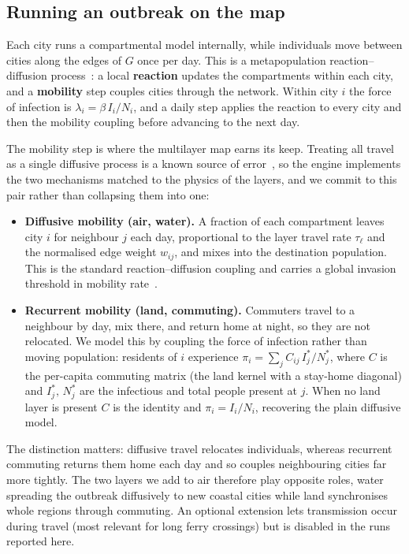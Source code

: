 \subsection{Running an outbreak on the map} \label{sec:outbreak}
Each city runs a compartmental model internally, while individuals move between cities along
the edges of $G$ once per day. This is a metapopulation reaction--diffusion process~\cite{colizza:reactiondiffusion}:
a local \textbf{reaction} updates the compartments within each city, and a
\textbf{mobility} step couples cities through the network. Within city $i$ the force of
infection is $\lambda_i = \beta\, I_i / N_i$, and a daily step applies the reaction to every
city and then the mobility coupling before advancing to the next day.

The mobility step is where the multilayer map earns its keep. Treating all travel as a single
diffusive process is a known source of error~\cite{balcan:recurrent}, so the engine
implements the two mechanisms matched to the physics of the layers, and we commit to this pair
rather than collapsing them into one:

\begin{itemize}
  \item \textbf{Diffusive mobility (air, water).} A fraction of each compartment leaves city $i$
  for neighbour $j$ each day, proportional to the layer travel rate $\tau_\ell$ and the
  normalised edge weight $w_{ij}$, and mixes into the destination population. This is the
  standard reaction--diffusion coupling and carries a global invasion threshold in mobility
  rate~\cite{colizza:invasion}.

  \item \textbf{Recurrent mobility (land, commuting).} Commuters travel to a neighbour by day,
  mix there, and return home at night, so they are not relocated. We model this by coupling the
  force of infection rather than moving population: residents of $i$ experience
  $\pi_i = \sum_j C_{ij}\, I^{*}_j / N^{*}_j$, where $C$ is the per-capita commuting matrix (the
  land kernel with a stay-home diagonal) and $I^{*}_j,\,N^{*}_j$ are the infectious and total
  people present at $j$. When no land layer is present $C$ is the identity and
  $\pi_i = I_i/N_i$, recovering the plain diffusive model.
\end{itemize}

The distinction matters: diffusive travel relocates individuals, whereas recurrent commuting
returns them home each day and so couples neighbouring cities far more tightly. The two layers we
add to air therefore play opposite roles, water spreading the outbreak diffusively to new coastal
cities while land synchronises whole regions through commuting. An optional extension lets
transmission occur during travel (most relevant for long ferry crossings) but is disabled in the
runs reported here.

